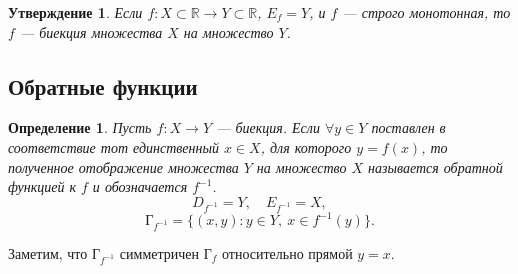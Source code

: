 \documentclass[a4paper,12pt]{article} %
\newtheorem{definition}{Определение}[section]
\newtheorem{lemma}{Утверждение}[section]
\theoremstyle{remark}
\theoremstyle{definition}
\begin{document}
\begin{lemma}
    Если $f : X \subset \mathbb{R} \to Y \subset \mathbb{R}$, $E_f = Y$, и $f$ --- строго монотонная,
    то $f$ --- биекция множества $X$ на множество $Y$.
\end{lemma}

\subsection{Обратные функции}
\begin{definition}
    Пусть $f : X \to Y$ --- биекция. Если $\forall y\in Y$ поставлен в соответствие тот единственный $x \in X$,
    для которого $y = f(x)$, то полученное отображение множества $Y$ на множество $X$ называется обратной функцией
    к $f$ и обозначается $f^{-1}$.
    \[D_{f^{-1}} = Y, \quad E_{f^{-1}} = X,\] 
    \[\text{Г}_{f^{-1}} = \{(x, y) : y\in Y, \ x \in f^{-1}(y)\} .\]
\end{definition}
\noindent Заметим, что Г$_{f^{-1}}$ симметричен Г$_f$ относительно прямой $y=x$.
\end{document}
